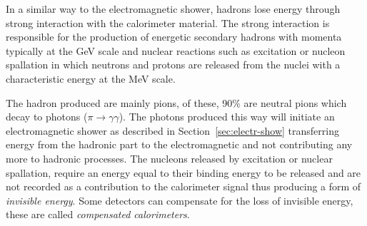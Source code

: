 In a similar way to the electromagnetic shower, hadrons lose energy through
strong interaction with the calorimeter material. The strong interaction is
responsible for the production of energetic secondary hadrons with momenta
typically at the GeV scale and nuclear reactions such as excitation or nucleon
spallation in which neutrons and protons are released from the nuclei with a
characteristic energy at the MeV scale.

The hadron produced are mainly pions, of these, 90\% are neutral pions which
decay to photons ($\pi \rightarrow \gamma \gamma$). The photons produced this
way will initiate an electromagnetic shower as described in
Section~\ref{sec:electr-show} transferring energy from the hadronic part to the
electromagnetic and not contributing any more to hadronic processes. The
nucleons released by excitation or nuclear spallation, require an energy equal
to their binding energy to be released and are not recorded as a contribution to
the calorimeter signal thus producing a form of \emph{invisible energy}. Some
detectors can compensate for the loss of invisible energy, these are called
\emph{compensated calorimeters}.
